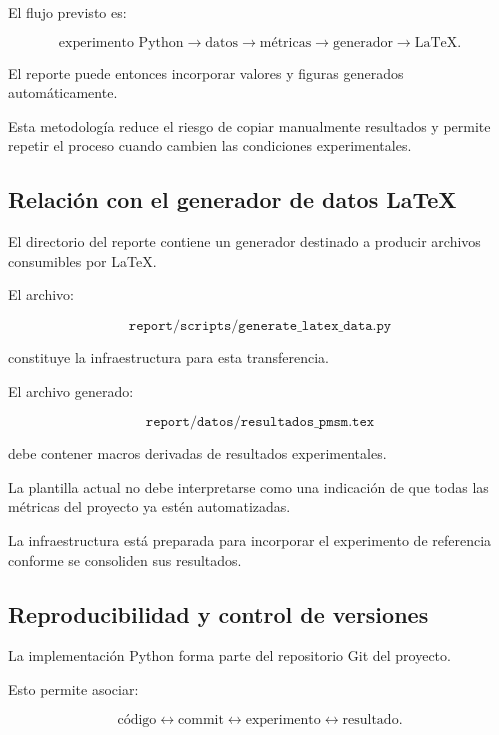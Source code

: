 El flujo previsto es:

\begin{equation}
\text{experimento Python}
\rightarrow
\text{datos}
\rightarrow
\text{métricas}
\rightarrow
\text{generador}
\rightarrow
\text{LaTeX}.
\end{equation}

El reporte puede entonces incorporar valores y figuras generados automáticamente.

Esta metodología reduce el riesgo de copiar manualmente resultados y permite repetir el proceso cuando cambien las condiciones experimentales.

\subsection{Relación con el generador de datos LaTeX}

El directorio del reporte contiene un generador destinado a producir archivos consumibles por LaTeX.

El archivo:

\begin{equation}
\texttt{report/scripts/generate\_latex\_data.py}
\end{equation}

constituye la infraestructura para esta transferencia.

El archivo generado:

\begin{equation}
\texttt{report/datos/resultados\_pmsm.tex}
\end{equation}

debe contener macros derivadas de resultados experimentales.

La plantilla actual no debe interpretarse como una indicación de que todas las métricas del proyecto ya estén automatizadas.

La infraestructura está preparada para incorporar el experimento de referencia conforme se consoliden sus resultados.

\subsection{Reproducibilidad y control de versiones}

La implementación Python forma parte del repositorio Git del proyecto.

Esto permite asociar:

\begin{equation}
\text{código}
\leftrightarrow
\text{commit}
\leftrightarrow
\text{experimento}
\leftrightarrow
\text{resultado}.
\end{equation}

